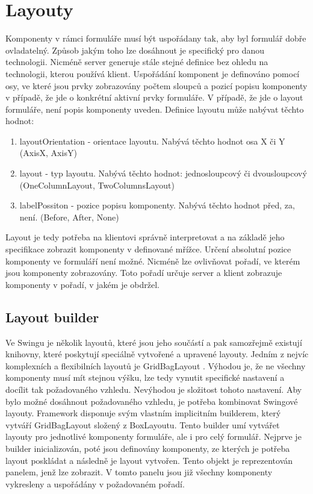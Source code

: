 \section{Layouty}
Komponenty v rámci formuláře musí být uspořádany tak, aby byl formulář dobře ovladatelný. Způsob jakým toho lze dosáhnout je specifický pro danou technologii. Nicméně server generuje stále stejné definice bez ohledu na technologii, kterou používá klient. Uspořádání komponent je definováno pomocí osy, ve které jsou prvky zobrazovány počtem sloupců a pozicí popisu komponenty v případě, že jde o konkrétní aktivní prvky formuláře. V případě, že jde o layout formuláře, není popis komponenty uveden. Definice layoutu může nabývat těchto hodnot:
\begin{enumerate}
\item layoutOrientation - orientace layoutu. Nabývá těchto hodnot osa X či Y (AxisX, AxisY)
\item layout - typ layoutu. Nabývá těchto hodnot: jednosloupcový či dvousloupcový (OneColumnLayout, TwoColumnsLayout)
\item labelPossiton - pozice popisu komponenty. Nabývá těchto hodnot před, za, není. (Before, After, None)
\end{enumerate}
Layout je tedy potřeba na klientovi správně interpretovat a na základě jeho specifikace zobrazit komponenty v definované mřížce. Určení absolutní pozice komponenty ve formuláří není možné. Nicméně lze ovlivňovat pořadí, ve kterém jsou komponenty zobrazovány. Toto pořadí určuje server a klient zobrazuje komponenty v pořadí, v jakém je obdržel. 
\subsection{Layout builder}
Ve Swingu je několik layoutů, které jsou jeho součástí a pak samozřejmě existují knihovny, které poskytují speciálně vytvořené a upravené layouty. Jedním z nejvíc komplexních a flexibilních layoutů je GridBagLayout \cite{gridBagLayout}. Výhodou je, že ne všechny komponenty musí mít stejnou výšku, lze tedy vynutit specifické nastavení a docílit tak požadovaného vzhledu. Nevýhodou je složitost tohoto nastavení. Aby bylo možné dosáhnout požadovaného vzhledu, je potřeba kombinovat Swingové layouty. Framework disponuje svým vlastním implicitním builderem, který vytváří GridBagLayout složený z BoxLayoutu. Tento builder umí vytvářet layouty pro jednotlivé komponenty formuláře, ale i pro celý formulář. Nejprve je builder inicializován, poté jsou definovány komponenty, ze kterých je potřeba layout poskládat a následně je layout vytvořen. Tento objekt je reprezentován panelem, jenž lze zobrazit. V tomto panelu jsou již všechny komponenty vykresleny a uspořádány v požadovaném pořadí. 

